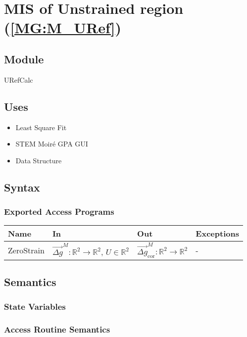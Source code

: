 \documentclass[12pt, titlepage]{article}
\begin{document}
\section{MIS of Unstrained region (\texorpdfstring{\cref{MG:M_URef}}))} \label{MIS_URef}

\subsection{Module}
URefCalc
\subsection{Uses}
\begin{itemize}
\item Least Square Fit
\item STEM Moir{\'e} GPA GUI
\item Data Structure
\end{itemize}

\subsection{Syntax}

\subsubsection{Exported Access Programs}

\begin{center}
\begin{tabular}{p{2cm} p{4cm} p{4cm} p{2cm}}
\hline
\textbf{Name} & \textbf{In} & \textbf{Out} & \textbf{Exceptions} \\
\hline
ZeroStrain & $\overrightarrow{\Delta g}^M:\mathbb{R}^2\rightarrow\mathbb{R}^2$, $U \in \mathbb{R}^2$  & $\overrightarrow{\Delta g}_{\text{cor}}^M:\mathbb{R}^2\rightarrow\mathbb{R}^2$ & - \\
\hline
\end{tabular}
\end{center}

\subsection{Semantics}

\subsubsection{State Variables}


\subsubsection{Access Routine Semantics}
\end{document}
